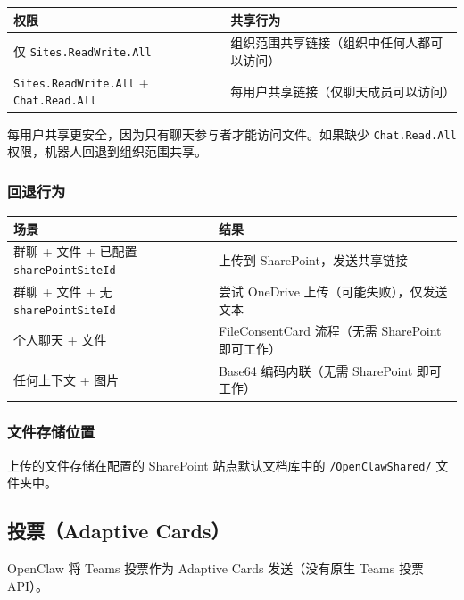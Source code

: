 \begin{table}[h]
\centering
\small
\begin{tabular}{|l|l|}
\hline
权限 & 共享行为 \\
\hline
仅 \texttt{Sites.ReadWrite.All} & 组织范围共享链接（组织中任何人都可以访问） \\
\hline
\texttt{Sites.ReadWrite.All} + \texttt{Chat.Read.All} & 每用户共享链接（仅聊天成员可以访问） \\
\hline
\end{tabular}
\end{table}



每用户共享更安全，因为只有聊天参与者才能访问文件。如果缺少 \texttt{Chat.Read.All} 权限，机器人回退到组织范围共享。

\subsubsection{回退行为}



\begin{table}[h]
\centering
\small
\begin{tabular}{|l|l|}
\hline
场景 & 结果 \\
\hline
群聊 + 文件 + 已配置 \texttt{sharePointSiteId} & 上传到 SharePoint，发送共享链接 \\
\hline
群聊 + 文件 + 无 \texttt{sharePointSiteId} & 尝试 OneDrive 上传（可能失败），仅发送文本 \\
\hline
个人聊天 + 文件 & FileConsentCard 流程（无需 SharePoint 即可工作） \\
\hline
任何上下文 + 图片 & Base64 编码内联（无需 SharePoint 即可工作） \\
\hline
\end{tabular}
\end{table}



\subsubsection{文件存储位置}


上传的文件存储在配置的 SharePoint 站点默认文档库中的 \texttt{/OpenClawShared/} 文件夹中。

\subsection{投票（Adaptive Cards）}


OpenClaw 将 Teams 投票作为 Adaptive Cards 发送（没有原生 Teams 投票 API）。

